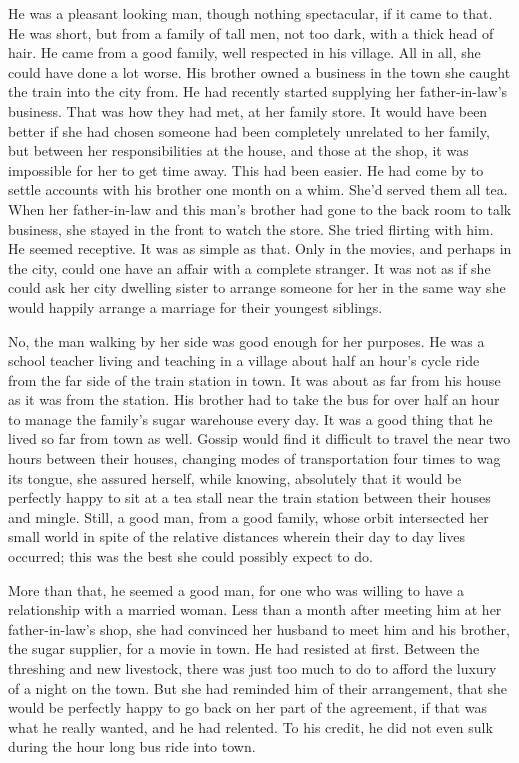 \documentclass{article}
\begin{document}
He was a pleasant looking man, though nothing spectacular, if it came to that. He was short, but from a family of tall men, not too dark, with a thick head of hair. He came from a good family, well respected in his village. All in all, she could have done a lot worse. His brother owned a business in the town she caught the train into the city from. He had recently started supplying her father-in-law's business. That was how they had met, at her family store. It would have been better if she had chosen someone had been completely unrelated to her family, but between her responsibilities at the house, and those at the shop, it was impossible for her to get time away. This had been easier. He had come by to settle accounts with his brother one month on a whim. She'd served them all tea. When her father-in-law and this man's brother had gone to the back room to talk business, she stayed in the front to watch the store. She tried flirting with him. He seemed receptive. It was as simple as that. Only in the movies, and perhaps in the city, could one have an affair with a complete stranger. It was not as if she could ask her city dwelling sister to arrange someone for her in the same way she would happily arrange a marriage for their youngest siblings. 

No, the man walking by her side was good enough for her purposes. He was a school teacher living and teaching in a village about half an hour's cycle ride from the far side of the train station in town. It was about as far from his house as it was from the station. His brother had to take the bus for over half an hour to manage the family's sugar warehouse every day. It was a good thing that he lived so far from town as well. Gossip would find it difficult to travel the near two hours between their houses, changing modes of transportation four times to wag its tongue, she assured herself, while knowing, absolutely that it would be perfectly happy to sit at a tea stall near the train station between their houses and mingle. Still, a good man, from a good family, whose orbit intersected her small world in spite of the relative distances wherein their day to day lives occurred; this was the best she could possibly expect to do.

More than that, he seemed a good man, for one who was willing to have a relationship with a married woman. Less than a month after meeting him at her father-in-law's shop, she had convinced her husband to meet him and his brother, the sugar supplier, for a movie in town. He had resisted at first. Between the threshing and new livestock, there was just too much to do to afford the luxury of a night on the town. But she had reminded him of their arrangement, that she would be perfectly happy to go back on her part of the agreement, if that was what he really wanted, and he had relented. To his credit, he did not even sulk during the hour long bus ride into town.
\end{document}
